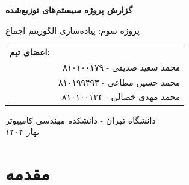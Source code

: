 \documentclass[12pt,a4paper]{article}
\begin{document}
\begin{titlepage}
    \centering
    \vspace*{2cm}
    
    {\huge\bfseries گزارش پروژه سیستم‌های توزیع‌شده}
    
    \vspace{1cm}
    {\Large پروژه سوم: پیاده‌سازی الگوریتم اجماع }
    
    \vspace{2cm}
    
    \begin{tabular}{lr}
 
       \textbf{اعضای تیم:} & \\
        & محمد سعید صدیقی - ۸۱۰۱۰۰۱۷۹ \\
        & محمد حسین مطاعی - ۸۱۰۱۹۹۴۹۳ \\
        & محمد مهدی خصالی - ۸۱۰۱۰۰۱۳۴ \\
    \end{tabular}
    
    \vfill
    
    {\large دانشگاه تهران - دانشکده مهندسی کامپیوتر}
    \\
    {\large بهار ۱۴۰۴}
\end{titlepage}

\tableofcontents
\newpage

\section{مقدمه}
\end{document}

